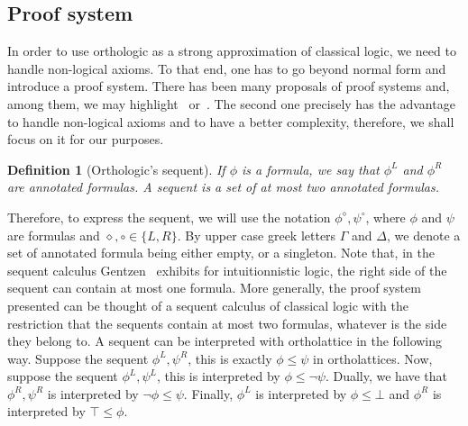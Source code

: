 \documentclass[a4paper, 11pt]{article}
\newtheorem{definition}[theorem]{Definition}
\begin{document}
    \subsection{Proof system}
    In order to use orthologic as a strong approximation of classical logic, we need to handle
    non-logical axioms. To that end, one has to go beyond normal form and introduce a proof system. 
    There has been 
    many proposals of proof systems and, among them, we may highlight~\cite{Laurent17a} 
    or~\cite{10.1145/3632881}. The second one precisely has the advantage to handle non-logical axioms 
    and to have a better complexity, therefore, we shall focus on it for our purposes. 
    \begin{definition}[Orthologic's sequent]
	    If $\phi$ is a formula, we say that $\phi^L$ and $\phi^R$ are annotated formulas. A 
	    sequent is a set of at most two annotated formulas.
    \end{definition}
    Therefore, to express the sequent, we will use the notation $\phi^\diamond,\psi^\circ$, where 
    $\phi$ and $\psi$ are formulas and $\diamond,\circ\in\{L,R\}$. By upper case greek letters $\Gamma$ 
    and $\Delta$, we denote a set of annotated formula being either empty, or a singleton. Note that,
    in the sequent calculus
    Gentzen~\cite{Gentzen1935UntersuchungenD} exhibits for intuitionnistic logic, the right side of the 
    sequent can contain at most one formula. More generally, the proof system presented can be thought
    of a sequent calculus of classical logic with the restriction that the sequents contain at most
    two formulas, whatever is the side they belong to.
    A sequent can be interpreted with ortholattice in the following way. Suppose the sequent 
    $\phi^L,\psi^R$, this is exactly $\phi\leq\psi$ in ortholattices. Now, suppose the sequent 
    $\phi^L,\psi^L$, this is interpreted by $\phi\leq\neg\psi$. Dually, we have that $\phi^R,\psi^R$
    is interpreted by $\neg\phi\leq\psi$. Finally, $\phi^L$ is interpreted by $\phi\leq\bot$ and
    $\phi^R$ is interpreted by $\top\leq\phi$.
\end{document}
